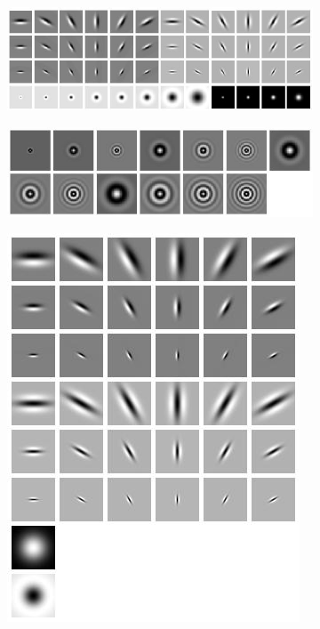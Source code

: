 \begin{figure}[h!]
	\begin{subfigure}[t]{0.38\textwidth}
		\centering
		\includegraphics[width=\textwidth,keepaspectratio]{images/vis/vis_01.jpg}
		\captionsetup{format=plain}
	\end{subfigure}
	\hfill
	\begin{subfigure}[t]{0.38\textwidth}
		\centering
		\includegraphics[width=\textwidth,keepaspectratio]{images/vis/vis_02.jpg}
	\end{subfigure}
	\hfill
	\begin{subfigure}[t]{0.21\textwidth}
		\centering
		\includegraphics[width=\textwidth,keepaspectratio]{images/vis/vis_03.jpg}

\end{subfigure}
\end{figure}
